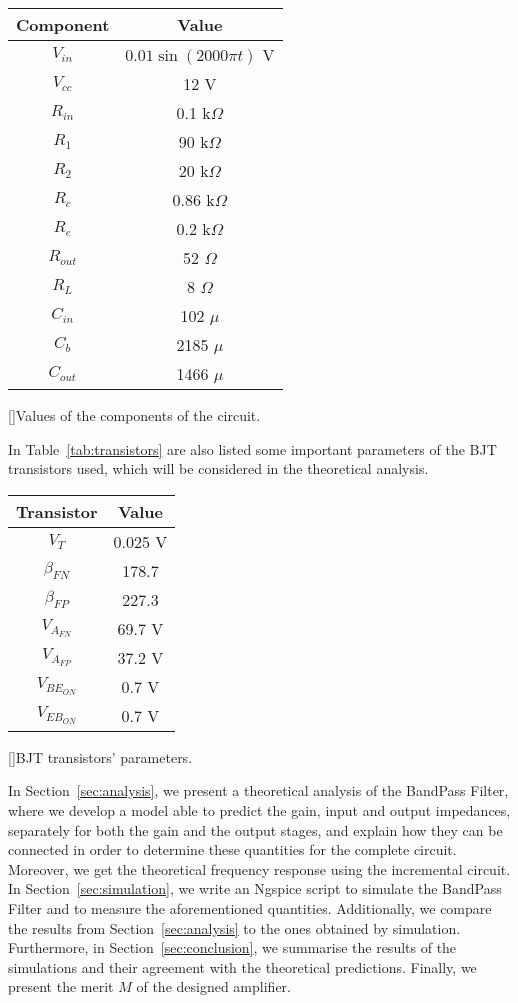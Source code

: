 \begin{center} 
\begin{tabular}{ | c | c | }
\hline
\textbf{Component} & \textbf{Value} \\
\hline
$V_{in}$ & $0.01\sin{(2000\pi t)}$ V \\
\hline
$V_{cc}$ & 12 V \\
\hline
$R_{in}$ & 0.1 k$\Omega$ \\
\hline
$R_1$ & 90 k$\Omega$ \\
\hline
$R_2$ & 20 k$\Omega$ \\
\hline
$R_c$ & 0.86 k$\Omega$ \\
\hline
$R_e$ & 0.2 k$\Omega$ \\
\hline
$R_{out}$ & 52 $\Omega$ \\
\hline
$R_L$ & 8 $\Omega$ \\
\hline
$C_{in}$ & 102 $\mu$ \\
\hline
$C_b$ & 2185 $\mu$ \\
\hline
$C_{out}$ & 1466 $\mu$ \\
\hline
\end{tabular}
[]{Values of the components of the circuit.}
\label{tab:components}
\end{center}

In Table~\ref{tab:transistors} are also listed some important parameters of the BJT transistors used, which will be considered in the theoretical analysis.

\begin{center}
\begin{tabular}{ | c | c | }
\hline
\textbf{Transistor} & \textbf{Value}\\
\hline
$V_T$ & 0.025 V \\
\hline
$\beta_{FN}$ & 178.7 \\
\hline
$\beta_{FP}$ & 227.3 \\
\hline
$V_{A_{FN}}$ & 69.7 V \\
\hline
$V_{A_{FP}}$ & 37.2 V \\
\hline
$V_{{BE}_{ON}}$ & 0.7 V \\
\hline
$V_{{EB}_{ON}}$ & 0.7 V \\
\hline
\end{tabular}
[]{BJT transistors' parameters.}
\label{tab:transistors}
\end{center}

In Section~\ref{sec:analysis}, we present a theoretical analysis of the BandPass Filter, where we develop a model able to predict the gain, input and output impedances, separately for both the gain and the output stages, and explain how they can be connected in order to determine these quantities for the complete circuit. Moreover, we get the theoretical frequency response using the incremental circuit. In Section~\ref{sec:simulation}, we write an Ngspice script to simulate the BandPass Filter and to measure the aforementioned quantities. Additionally, we compare the results from Section~\ref{sec:analysis} to the ones obtained by simulation. Furthermore, in Section~\ref{sec:conclusion}, we summarise the results of the simulations and their agreement with the theoretical predictions. Finally, we present the merit $M$ of the designed amplifier.

